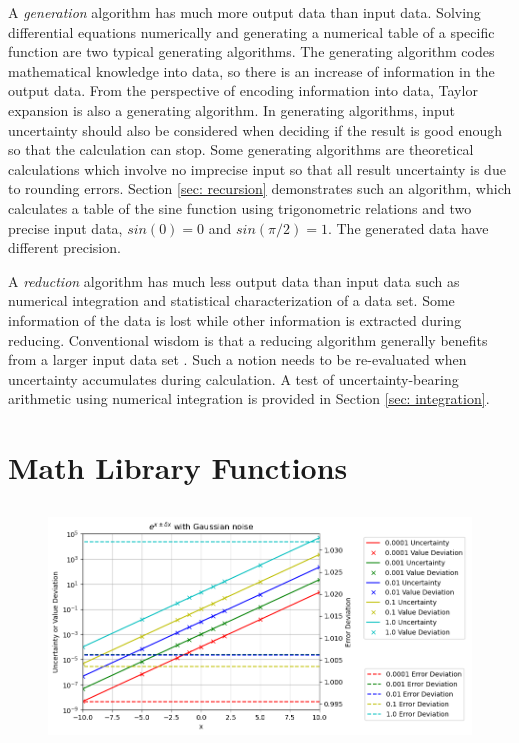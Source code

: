 \documentclass[twoside]{article}
\numberwithin{equation}{section}
\begin{document}
A \emph{generation} algorithm has much more output data than input data.  
Solving differential equations numerically and generating a numerical table of a specific function are two typical generating algorithms.  
The generating algorithm codes mathematical knowledge into data, so there is an increase of information in the output data.  
From the perspective of encoding information into data, Taylor expansion is also a generating algorithm. 
In generating algorithms, input uncertainty should also be considered when deciding if the result is good enough so that the calculation can stop.  
Some generating algorithms are theoretical calculations which involve no imprecise input so that all result uncertainty is due to rounding errors.  
Section \ref{sec: recursion} demonstrates such an algorithm, which calculates a table of the sine function using trigonometric relations and two precise input data, $sin(0)=0$ and $sin(\pi/2)=1$.  
The generated data have different precision.

A \emph{reduction} algorithm has much less output data than input data such as numerical integration and statistical characterization of a data set.  
Some information of the data is lost while other information is extracted during reducing.  
Conventional wisdom is that a reducing algorithm generally benefits from a larger input data set \cite{Probability_Statistics}.  
Such a notion needs to be re-evaluated when uncertainty accumulates during calculation.  
A test of uncertainty-bearing arithmetic using numerical integration is provided in Section \ref{sec: integration}.



\clearpage
\section{Math Library Functions}
\label{sec: Math Library}

\begin{figure}[p]
\centering
\includegraphics[height=2.5in]{Exp_Dev.png} 
\label{fig: Exp_Dev}
\end{figure}
\end{document}
